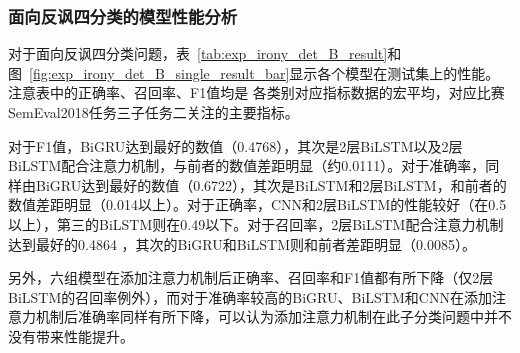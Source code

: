 \subsubsection{面向反讽四分类的模型性能分析}
\label{sssec:exp_irony_det_B_base}

对于面向反讽四分类问题，表~\ref{tab:exp_irony_det_B_result}和图~\ref{fig:exp_irony_det_B_single_result_bar}显示各个模型在测试集上的性能。注意表中的正确率、召回率、F1值均是
各类别对应指标数据的宏平均，对应比赛SemEval2018任务三子任务二关注的主要指标。

对于F1值，BiGRU达到最好的数值（0.4768），其次是2层BiLSTM以及2层BiLSTM配合注意力机制，与前者的数值差距明显（约0.0111）。对于准确率，同样由BiGRU达到最好的数值（0.6722），其次是BiLSTM和2层BiLSTM，和前者的数值差距明显（0.014以上）。对于正确率，CNN和2层BiLSTM的性能较好（在0.5以上），第三的BiLSTM则在0.49以下。对于召回率，2层BiLSTM配合注意力机制达到最好的0.4864 ，其次的BiGRU和BiLSTM则和前者差距明显（0.0085）。

另外，六组模型在添加注意力机制后正确率、召回率和F1值都有所下降（仅2层BiLSTM的召回率例外），而对于准确率较高的BiGRU、BiLSTM和CNN在添加注意力机制后准确率同样有所下降，可以认为添加注意力机制在此子分类问题中并不没有带来性能提升。

